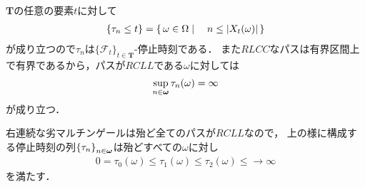 	\begin{sketch}
		$\mathbf{T}$の任意の要素$t$に対して
		\begin{align}
			\left\{\tau_n \leq t\right\} = \left\{\, \omega \in \Omega \mid \quad n \leq |X_t(\omega)|\, \right\}
		\end{align}
		が成り立つので$\tau_n$は$\{\mathscr{F}_t\}_{t \in \mathbf{T}}$-停止時刻である．
		また$RLCC$なパスは有界区間上で有界であるから，パスが$RCLL$である$\omega$に対しては
		\begin{align}
			\operatorname*{sup}_{n \in {\boldsymbol \omega}} \tau_n(\omega) = \infty
		\end{align}
		が成り立つ．
		\QED
	\end{sketch}
	
	右連続な劣マルチンゲールは殆ど全てのパスが$RCLL$なので，
	上の様に構成する停止時刻の列$\left\{\tau_n\right\}_{n \in {\boldsymbol \omega}}$は殆どすべての$\omega$に対し
	\begin{align}
		0 = \tau_0(\omega) \leq \tau_1(\omega) \leq \tau_2(\omega) \leq \longrightarrow \infty
	\end{align}
	を満たす．
	